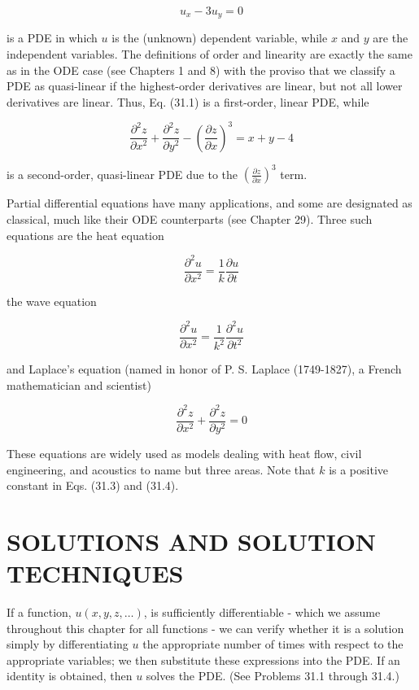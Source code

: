 \documentclass[10pt]{article}
\begin{document}
\begin{equation*}
u_{x}-3 u_{y}=0 \tag{31.1}
\end{equation*}


is a PDE in which $u$ is the (unknown) dependent variable, while $x$ and $y$ are the independent variables. The definitions of order and linearity are exactly the same as in the ODE case (see Chapters 1 and 8) with the proviso that we classify a PDE as quasi-linear if the highest-order derivatives are linear, but not all lower derivatives are linear. Thus, Eq. (31.1) is a first-order, linear PDE, while


\begin{equation*}
\frac{\partial^{2} z}{\partial x^{2}}+\frac{\partial^{2} z}{\partial y^{2}}-\left(\frac{\partial z}{\partial x}\right)^{3}=x+y-4 \tag{31.2}
\end{equation*}


is a second-order, quasi-linear PDE due to the $\left(\frac{\partial z}{\partial x}\right)^{3}$ term.

Partial differential equations have many applications, and some are designated as classical, much like their ODE counterparts (see Chapter 29). Three such equations are the heat equation


\begin{equation*}
\frac{\partial^{2} u}{\partial x^{2}}=\frac{1}{k} \frac{\partial u}{\partial t} \tag{31.3}
\end{equation*}


the wave equation


\begin{equation*}
\frac{\partial^{2} u}{\partial x^{2}}=\frac{1}{k^{2}} \frac{\partial^{2} u}{\partial t^{2}} \tag{31.4}
\end{equation*}


and Laplace's equation (named in honor of P. S. Laplace (1749-1827), a French mathematician and scientist)


\begin{equation*}
\frac{\partial^{2} z}{\partial x^{2}}+\frac{\partial^{2} z}{\partial y^{2}}=0 \tag{31.5}
\end{equation*}


These equations are widely used as models dealing with heat flow, civil engineering, and acoustics to name but three areas. Note that $k$ is a positive constant in Eqs. (31.3) and (31.4).

\section*{SOLUTIONS AND SOLUTION TECHNIQUES}
If a function, $u(x, y, z, \ldots)$, is sufficiently differentiable - which we assume throughout this chapter for all functions - we can verify whether it is a solution simply by differentiating $u$ the appropriate number of times with respect to the appropriate variables; we then substitute these expressions into the PDE. If an identity is obtained, then $u$ solves the PDE. (See Problems 31.1 through 31.4.)
\end{document}

